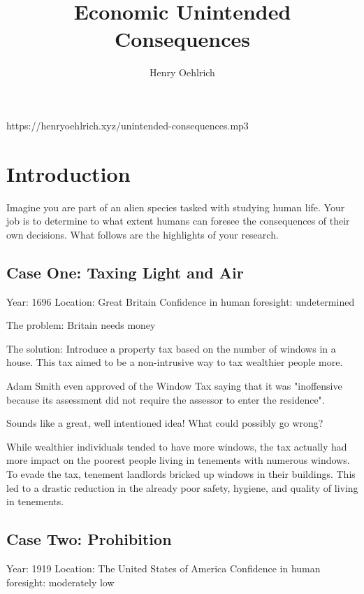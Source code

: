 \documentclass{article}
\author{Henry Oehlrich}
\title{Economic Unintended Consequences}
\begin{document}
\autocite{merton1936}
\autocite{hayek1945}
\autocite{econlib2023}
\autocite{reason2019}
\autocite{reason2023}
\autocite{fda2023}
\autocite{intelligencer2020}
\autocite{wired2022}
\autocite{simpleflying2020}
\autocite{usdot2014}
\autocite{reason2018}

\newpage

https://henryoehlrich.xyz/unintended-consequences.mp3

\section{Introduction}

Imagine you are part of an alien species tasked with studying human life. Your
job is to determine to what extent humans can foresee the consequences of their
own decisions. What follows are the highlights of your research.

\subsection{Case One: Taxing Light and Air}

Year: 1696
Location: Great Britain
Confidence in human foresight: undetermined

The problem: Britain needs money

The solution: Introduce a property tax based on the number of windows in a
house. This tax aimed to be a non-intrusive way to tax wealthier people more.

Adam Smith even approved of the Window Tax saying that it was "inoffensive
because its assessment did not require the assessor to enter the residence".

Sounds like a great, well intentioned idea! What could possibly go wrong?

While wealthier individuals tended to have more windows, the tax actually had
more impact on the poorest people living in tenements with numerous windows. To
evade the tax, tenement landlords bricked up windows in their buildings. This
led to a drastic reduction in the already poor safety, hygiene, and quality of
living in tenements.

\subsection{Case Two: Prohibition}

Year: 1919
Location: The United States of America
Confidence in human foresight: moderately low
\end{document}
